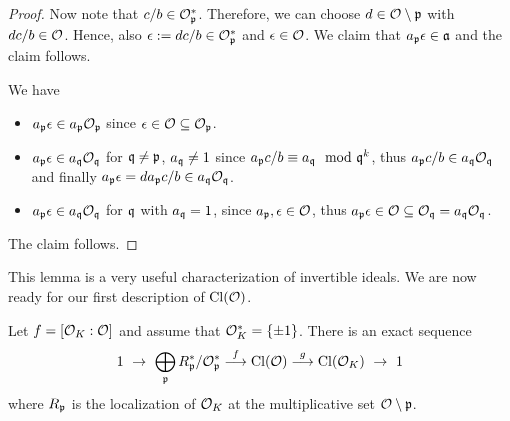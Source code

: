 \begin{proof}
    Now note that $c/b \in \O_\p^*$.
    Therefore, we can choose $d \in \O \setminus \p$ with $dc/b \in \O$.
    Hence, also $\epsilon := dc/b \in \O_\p^*$ and $\epsilon \in \O$.
    We claim that $a_\p \epsilon \in \a$ and the claim follows.

    We have
    \begin{itemize}
        \item $a_\p \epsilon \in a_\p\O_\p$ since $\epsilon \in \O \subseteq \O_\p$.
        \item $a_\p \epsilon \in a_\q\O_\q$ for $\q \neq \p$, $a_\q \neq 1$ since $a_\p c/b \equiv a_\q \mod \q^k$, thus $a_\p c/b \in a_\q\O_\q$ and finally $a_\p \epsilon = d a_\p c/b \in a_\q\O_\q$.
        \item $a_\p \epsilon \in a_\q\O_\q$ for $\q$ with $a_\q = 1$, since $a_\p, \epsilon \in \O$, thus $a_\p \epsilon \in \O \subseteq \O_\q = a_\q\O_\q$.
    \end{itemize}
    The claim follows.
\end{proof}
This lemma is a very useful characterization of invertible ideals.
We are now ready for our first description of $\Cl(\O)$.
\begin{lemma}
    Let $f = [\O_K : \O]$ and assume that $\O_K^* = \{ \pm 1 \}$.
    There is an exact sequence
    \begin{equation*}
        1 \ \to \ \bigoplus_\p R_\p^*/\O_\p^* \overset{f}{\longrightarrow} \Cl(\O) \overset{g}{\longrightarrow} \Cl(\O_K) \ \to \ 1
    \end{equation*}
    where $R_\p$ is the localization of $\O_K$ at the multiplicative set $\O \setminus \p$.
\end{lemma}
